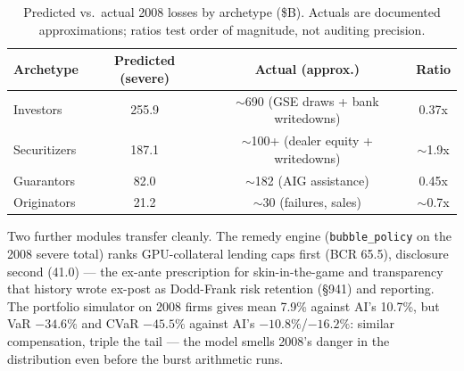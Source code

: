 \documentclass[11pt,a4paper]{article}
\begin{document}
\begin{table}[htbp]
\centering
\caption{Predicted vs.\ actual 2008 losses by archetype (\$B). Actuals are documented approximations; ratios test order of magnitude, not auditing precision.}
    \label{tab:42-predicted-vs-actual}
{\small
\begin{tabular}{lccc}
\toprule
Archetype & Predicted (severe) & Actual (approx.) & Ratio \\
\midrule
Investors & 255.9 & $\sim$690 (GSE draws + bank writedowns) & 0.37x \\
Securitizers & 187.1 & $\sim$100+ (dealer equity + writedowns) & $\sim$1.9x \\
Guarantors & 82.0 & $\sim$182 (AIG assistance) & 0.45x \\
Originators & 21.2 & $\sim$30 (failures, sales) & $\sim$0.7x \\
\bottomrule
\end{tabular}
\par}
\end{table}

Two further modules transfer cleanly. The remedy engine
(\texttt{bubble\_policy} on the 2008 severe total) ranks GPU-collateral
lending caps first (BCR 65.5), disclosure second (41.0) --- the ex-ante
prescription for skin-in-the-game and transparency that history wrote
ex-post as Dodd-Frank risk retention (\S941) and reporting. The portfolio
simulator on 2008 firms gives mean 7.9\% against AI's 10.7\%, but VaR
$-34.6\%$ and CVaR $-45.5\%$ against AI's $-10.8\%$/$-16.2\%$: similar
compensation, triple the tail --- the model smells 2008's danger in the
distribution even before the burst arithmetic runs.
\end{document}

